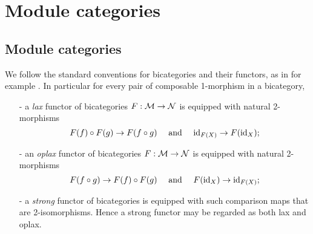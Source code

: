 \documentclass{amsart}
\begin{document}
\section{Module categories} \label{sec:tc-bimod}


\subsection{Module categories} %

We follow the standard conventions for bicategories and their functors, as in for example \cite{MR2664622}. In particular for every pair of composable 1-morphism in a bicategory, 
\begin{itemize}
	\item[-] a {\em lax} functor of bicategories $F: \mathcal M \to \mathcal N$ is equipped with natural 2-morphisms   
	\begin{equation*}
		F(f) \circ F(g) \to F(f \circ g) \quad \textrm{ and } \quad \mathrm{id}_{F(X)} \to F(\mathrm{id}_X);
	\end{equation*} 
	\item[-] an {\em oplax} functor of bicategories $F: \mathcal M \to \mathcal N$ is equipped with natural 2-morphisms
	\begin{equation*}
		F(f \circ g) \to F(f) \circ F(g)   \quad \textrm{ and } \quad F(\mathrm{id}_X) \to \mathrm{id}_{F(X)};
	\end{equation*}
	\item[-] a {\em strong} functor of bicategories is equipped with such comparison maps that are 2-isomorphisms. Hence a strong functor may be regarded as both lax and oplax. 
\end{itemize} 
\end{document}
